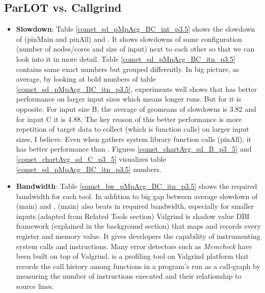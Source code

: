 








\subsection{ParLOT vs. Callgrind}

\begin{itemize}
\item \textbf{Slowdown}: Table \ref{comet_sd_pMpAcg_BC_int_p3.5} shows the slowdown of \parlot (pinMain and pinAll) and \callgrind. It shows slowdowns of same configuration (number of nodes/cores and size of input) next to each other so that we can look into it in more detail.
Table \ref{comet_sd_pMpAcg_BC_itn_p3.5} contains same exact numbers but grouped differently. In big picture, as average, by looking at bold numbers of table \ref{comet_sd_pMpAcg_BC_itn_p3.5}, experiments well shows that \parlot has better performance on larger input sizes which means longer runs. But for \callgrind it is opposite. For input size B, the average of geomeans of slowdowns is 3.82 and for input C it is 4.88. The key reason of this better performance is more repetition of target data to collect (which is function calls) on larger input sizes, I believe. Even when \parlot gathers system library function calls (pinAll), it has better performance than \callgrind. Figures \ref{comet_chartAvg_sd_B_p3_5} and \ref{comet_chartAvg_sd_C_p3_5} visualizes table \ref{comet_sd_pMpAcg_BC_itn_p3.5} numbers.
\item \textbf{Bandwidth}: Table \ref{comet_bw_pMpAcg_BC_itn_p3.5} shows the required bandwidth for each tool. In addition to big gap between average slowdown of \parlot(main) and \callgrind, \parlot(main) also beats \callgrind in required bandwidth, especially for smaller inputs.(adapted from Related Tools section) Valgrind is shadow value DBI framework (explained in the background section) that maps and records every register and memory value. It gives developers the capability of instrumenting system calls and instructions. Many error detectors such as \textit{Memcheck} have been built on top of Valgrind. \callgrind is a profiling tool  on Valgrind platform that records the call history among functions in a program's run as a call-graph by measuring the number of instructions executed and their relationship to source lines. 

\end{itemize}
